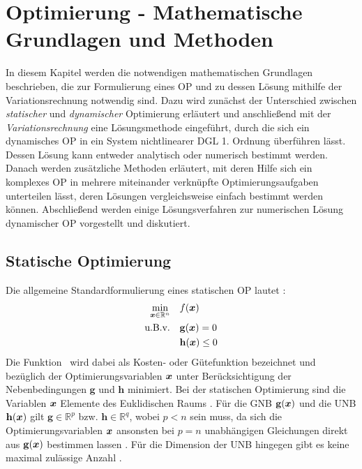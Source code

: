 \chapter{Optimierung - Mathematische Grundlagen und Methoden}\label{cha:Optimierung}
In diesem Kapitel werden die notwendigen mathematischen Grundlagen beschrieben, die zur Formulierung eines \gls{OP} und zu dessen Lösung mithilfe der Variationsrechnung notwendig sind. Dazu wird zunächst der Unterschied zwischen \textit{statischer} und \textit{dynamischer} Optimierung erläutert und anschließend mit der \textit{Variationsrechnung} eine Lösungsmethode eingeführt, durch die sich ein dynamisches \gls{OP} in ein System nichtlinearer \gls{DGL} 1. Ordnung überführen lässt. Dessen Lösung kann entweder analytisch oder numerisch bestimmt werden. Danach werden zusätzliche Methoden erläutert, mit deren Hilfe sich ein komplexes \gls{OP} in mehrere miteinander verknüpfte Optimierungsaufgaben unterteilen lässt, deren Lösungen vergleichsweise einfach bestimmt werden können. Abschließend werden einige Lösungsverfahren zur numerischen Lösung dynamischer \gls{OP} vorgestellt und diskutiert. 
\section{Statische Optimierung}\label{sec:statischeOpt}
Die allgemeine Standardformulierung eines statischen \gls{OP} lautet \cite{KnutGraichen.2012}:
\begin{align}
	\min_{\boldsymbol{x}\in\mathbb{R}^n} \quad &f(\boldsymbol{x}) \label{eq:J_statisch}\\
	\textrm{u.B.v.} \quad&\mathbf{g}(\boldsymbol{x}) = 0 \label{eq:GNB_statisch}\\
	&\mathbf{h}(\boldsymbol{x}) \leq 0 \label{eq:UNB_statisch}
\end{align}
Die Funktion \fofx~wird dabei als Kosten- oder Gütefunktion bezeichnet und bezüglich der Optimierungsvariablen $\boldsymbol{x}$ unter Berücksichtigung der Nebenbedingungen $\mathbf{g}$ und $\mathbf{h}$ minimiert. Bei der statischen Optimierung sind die Variablen $\boldsymbol{x}$ Elemente des Euklidischen Raums \cite{KnutGraichen.2012}. Für die \gls{GNB} $\mathbf{g}(\boldsymbol{x})$ und die \gls{UNB} $\mathbf{h}(\boldsymbol{x})$ gilt $\mathbf{g}\in\mathbb{R}^p$ bzw. $\mathbf{h}\in\mathbb{R}^q$, wobei $p<n$ sein muss, da sich die Optimierungsvariablen $\boldsymbol{x}$ ansonsten bei $p=n$ unabhängigen Gleichungen direkt aus $\mathbf{g}(\boldsymbol{x})$ bestimmen lassen \cite{Papageorgiou.2012}. Für die Dimension der \gls{UNB} hingegen gibt es keine maximal zulässige Anzahl \cite{Papageorgiou.2012}.
